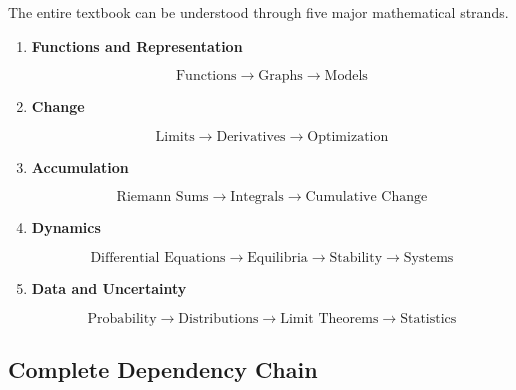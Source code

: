 \documentclass[11pt]{article}
\begin{document}
The entire textbook can be understood through five major mathematical
strands.

\begin{enumerate}
    \item \textbf{Functions and Representation}
    
    \[
    \text{Functions}
    \rightarrow
    \text{Graphs}
    \rightarrow
    \text{Models}
    \]
    
    \item \textbf{Change}
    
    \[
    \text{Limits}
    \rightarrow
    \text{Derivatives}
    \rightarrow
    \text{Optimization}
    \]
    
    \item \textbf{Accumulation}
    
    \[
    \text{Riemann Sums}
    \rightarrow
    \text{Integrals}
    \rightarrow
    \text{Cumulative Change}
    \]
    
    \item \textbf{Dynamics}
    
    \[
    \text{Differential Equations}
    \rightarrow
    \text{Equilibria}
    \rightarrow
    \text{Stability}
    \rightarrow
    \text{Systems}
    \]
    
    \item \textbf{Data and Uncertainty}
    
    \[
    \text{Probability}
    \rightarrow
    \text{Distributions}
    \rightarrow
    \text{Limit Theorems}
    \rightarrow
    \text{Statistics}
    \]
\end{enumerate}

\subsection{Complete Dependency Chain}
\end{document}
